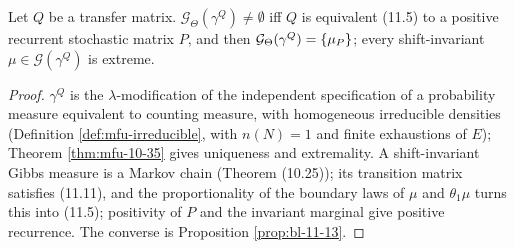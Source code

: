 \begin{theorem}[Georgii (11.13)]
    \label{thm:bl-11-13}
    \leanok

    Let $Q$ be a transfer matrix. $\mathcal G_\Theta(\gamma^Q) \neq \emptyset$ iff $Q$ is
    equivalent (11.5) to a positive recurrent stochastic matrix $P$, and then
    $\mathcal G_\Theta(\gamma^Q) = \left\{ \mu_P \right\}$; every shift-invariant $\mu \in \mathcal G(\gamma^Q)$
    is extreme.
\end{theorem}
\begin{proof}
    \leanok
    $\gamma^Q$ is the $\lambda$-modification of the independent specification of a probability
    measure equivalent to counting measure, with homogeneous irreducible densities (Definition
    \ref{def:mfu-irreducible}, with $n(N) = 1$ and finite exhaustions of $E$); Theorem
    \ref{thm:mfu-10-35} gives uniqueness and extremality. A shift-invariant Gibbs measure is a
    Markov chain (Theorem (10.25)); its transition matrix satisfies (11.11), and the proportionality
    of the boundary laws of $\mu$ and $\theta_1\mu$ turns this into (11.5); positivity of $P$ and
    the invariant marginal give positive recurrence. The converse is Proposition \ref{prop:bl-11-13}.
\end{proof}

